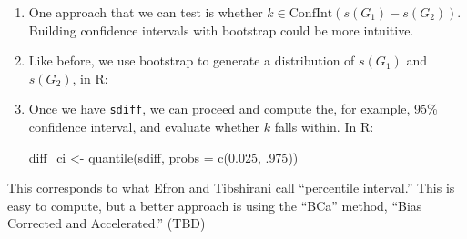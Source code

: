 \documentclass[
]{book}
\newenvironment{Shaded}{\begin{snugshade}}{\end{snugshade}}
\newcommand{\AttributeTok}[1]{\textcolor[rgb]{0.77,0.63,0.00}{#1}}
\newcommand{\CommentTok}[1]{\textcolor[rgb]{0.56,0.35,0.01}{\textit{#1}}}
\newcommand{\ControlFlowTok}[1]{\textcolor[rgb]{0.13,0.29,0.53}{\textbf{#1}}}
\newcommand{\DecValTok}[1]{\textcolor[rgb]{0.00,0.00,0.81}{#1}}
\newcommand{\FloatTok}[1]{\textcolor[rgb]{0.00,0.00,0.81}{#1}}
\newcommand{\FunctionTok}[1]{\textcolor[rgb]{0.00,0.00,0.00}{#1}}
\newcommand{\NormalTok}[1]{#1}
\newcommand{\OtherTok}[1]{\textcolor[rgb]{0.56,0.35,0.01}{#1}}
\newcommand{\SpecialCharTok}[1]{\textcolor[rgb]{0.00,0.00,0.00}{#1}}
\begin{document}
\begin{enumerate}
\def\labelenumi{\arabic{enumi}.}
\item
  One approach that we can test is whether \(k \in \mbox{ConfInt}(s(G_1) - s(G_2))\).
  Building confidence intervals with bootstrap could be more intuitive.
\item
  Like before, we use bootstrap to generate a distribution of \(s(G_1)\) and
  \(s(G_2)\), in R:

\begin{Shaded}
\end{Shaded}
\item
  Once we have \texttt{sdiff}, we can proceed and compute the, for example, 95\%
  confidence interval, and evaluate whether \(k\) falls within. In R:

\begin{Shaded}
\begin{Highlighting}[]
\NormalTok{diff\_ci }\OtherTok{\textless{}{-}} \FunctionTok{quantile}\NormalTok{(sdiff, }\AttributeTok{probs =} \FunctionTok{c}\NormalTok{(}\FloatTok{0.025}\NormalTok{, .}\DecValTok{975}\NormalTok{))}
\end{Highlighting}
\end{Shaded}
\end{enumerate}

This corresponds to what Efron and Tibshirani call ``percentile interval.''
This is easy to compute, but a better approach is using the ``BCa'' method,
``Bias Corrected and Accelerated.'' (TBD)
\end{document}

